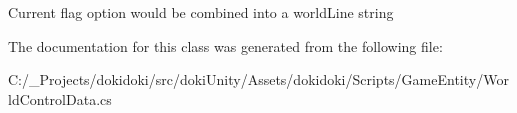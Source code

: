 Current flag option would be combined into a world\+Line string 



The documentation for this class was generated from the following file\+:\begin{DoxyCompactItemize}
\item 
C\+:/\+\_\+\+Projects/dokidoki/src/doki\+Unity/\+Assets/dokidoki/\+Scripts/\+Game\+Entity/World\+Control\+Data.\+cs\end{DoxyCompactItemize}
